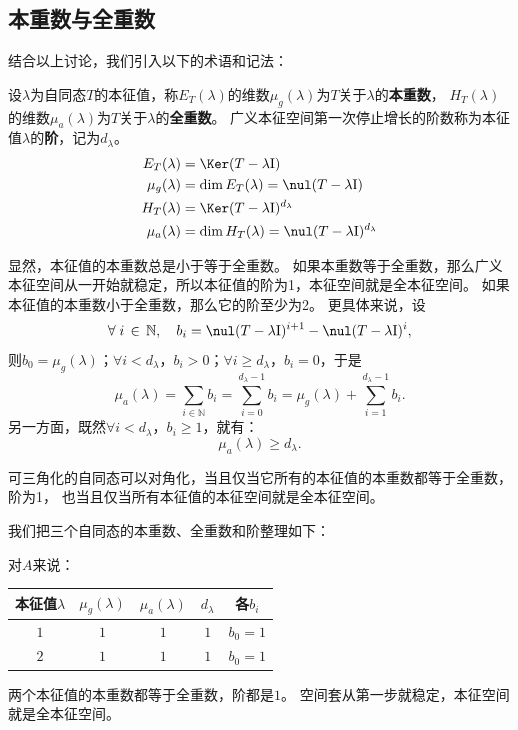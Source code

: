 \documentclass[12pt,UTF8,fontset=none]{ctexbook}
\begin{document}
\subsection{本重数与全重数}
结合以上讨论，我们引入以下的术语和记法：

\begin{df}\label{df:6_4_3}
    设$\lambda$为自同态$T$的本征值，称$E_T(\lambda)$的维数$\mu_g(\lambda)$为$T$关于$\lambda$的\textbf{本重数}，
    $H_T(\lambda)$的维数$\mu_a(\lambda)$为$T$关于$\lambda$的\textbf{全重数}。
    广义本征空间第一次停止增长的阶数称为本征值$\lambda$的\textbf{阶}，记为$d_\lambda$。
    \begin{align*}
        E_T(\lambda) &= \Ker (T - \lambda\mathrm{I})  \\
        \mu_g(\lambda) &= \dim E_T(\lambda) = \nul (T - \lambda\mathrm{I})  \\
        H_T(\lambda) &= \Ker (T - \lambda\mathrm{I})^{d_\lambda}  \\
        \mu_a(\lambda) &= \dim H_T(\lambda) = \nul (T - \lambda\mathrm{I})^{d_\lambda} 
    \end{align*}
\end{df}
显然，本征值的本重数总是小于等于全重数。
如果本重数等于全重数，那么广义本征空间从一开始就稳定，所以本征值的阶为1，本征空间就是全本征空间。
如果本征值的本重数小于全重数，那么它的阶至少为2。
更具体来说，设
$$ \forall \; i\,\in\, \mathbb{N},\quad b_i = \nul (T - \lambda\mathrm{I})^{i+1} - \nul (T - \lambda\mathrm{I})^{i},$$
则$b_0 = \mu_g(\lambda)$；$\forall i<d_{\lambda}$，$b_i>0$；$\forall i\geqslant d_{\lambda}$，$b_i=0$，于是
$$ \mu_a(\lambda) = \sum_{i\in\mathbb{N}} b_i = \sum_{i=0}^{d_{\lambda}-1} b_i = \mu_g(\lambda) + \sum_{i=1}^{d_\lambda-1} b_i.$$
另一方面，既然$\forall i<d_{\lambda}$，$b_i \geqslant 1$，就有：
$$ \mu_a(\lambda) \geqslant d_\lambda.$$

可三角化的自同态可以对角化，当且仅当它所有的本征值的本重数都等于全重数，阶为1，
也当且仅当所有本征值的本征空间就是全本征空间。

我们把三个自同态的本重数、全重数和阶整理如下：

对$A$来说：
\begin{center}
\begin{tabular}{c|c|c|c|c}
本征值$\lambda$ & $\mu_g(\lambda)$ & $\mu_a(\lambda)$ & $d_\lambda$ & 各$b_i$ \\
\hline
$1$ & $1$ & $1$ & $1$ & $b_0 = 1$ \\
$2$ & $1$ & $1$ & $1$ & $b_0 = 1$ \\
\end{tabular}
\end{center}
两个本征值的本重数都等于全重数，阶都是$1$。
空间套从第一步就稳定，本征空间就是全本征空间。
\end{document}

